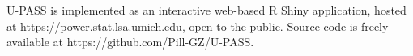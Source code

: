 
U-PASS is implemented as an interactive web-based R Shiny application, hosted at {https://power.stat.lsa.umich.edu}, open to the public. 
Source code is freely available at {https://github.com/Pill-GZ/U-PASS}.
